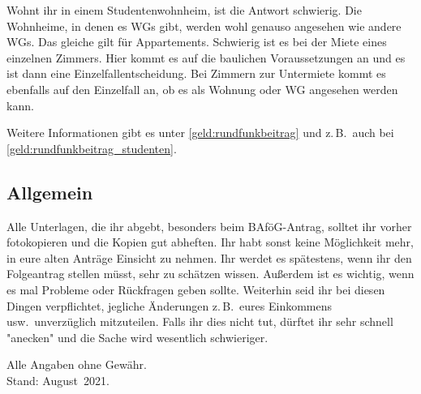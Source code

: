 \begin{multicols*}{2}
Wohnt ihr in einem Studentenwohnheim, ist die Antwort schwierig.
Die Wohnheime, in denen es WGs gibt, werden wohl genauso angesehen wie andere WGs.
Das gleiche gilt für Appartements.
Schwierig ist es bei der Miete eines einzelnen Zimmers.
Hier kommt es auf die baulichen Voraussetzungen an und es ist dann eine Einzelfallentscheidung.
Bei Zimmern zur Untermiete kommt es ebenfalls auf den Einzelfall an, ob es als Wohnung oder WG angesehen werden kann.

Weitere Informationen gibt es unter \cref{geld:rundfunkbeitrag} und z.\,B.\ auch bei \cref{geld:rundfunkbeitrag_studenten}.

\vspace{-2ex}

\subsection{Allgemein}
Alle Unterlagen, die ihr abgebt, besonders beim BAföG-Antrag, solltet ihr vorher fotokopieren und die Kopien gut abheften.
Ihr habt sonst keine Möglichkeit mehr, in eure alten Anträge Einsicht zu nehmen.
Ihr werdet es spätestens, wenn ihr den Folgeantrag stellen müsst, sehr zu schätzen wissen.
Außerdem ist es wichtig, wenn es mal Probleme oder Rückfragen geben sollte.
Weiterhin seid ihr bei diesen Dingen verpflichtet, jegliche Änderungen z.\,B.\ eures Einkommens usw.\ unverzüglich mitzuteilen.
Falls ihr dies nicht tut, dürftet ihr sehr schnell "anecken" und die Sache wird wesentlich schwieriger.

\begin{flushright}
	Alle Angaben ohne Gewähr.\\
	Stand: August~2021.
\end{flushright}

\vspace{-2ex}


\end{multicols*}
